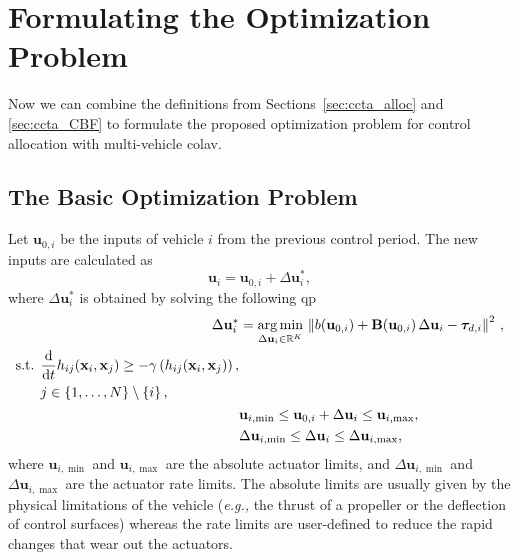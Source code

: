 \section{Formulating the Optimization Problem}
\label{sec:ccta_optimization}
Now we can combine the definitions from Sections~\ref{sec:ccta_alloc} and \ref{sec:ccta_CBF} to formulate the proposed optimization problem for control allocation with multi-vehicle \gls{colav}.

\subsection{The Basic Optimization Problem}
Let $\mathbf{u}_{0,i}$ be the inputs of vehicle $i$ from the previous control period.
The new inputs are calculated as
\begin{equation}
    \mathbf{u}_{i} = \mathbf{u}_{0,i} + \Delta\mathbf{u}_{i}^*,
\end{equation}
where $\Delta\mathbf{u}_{i}^*$ is obtained by solving the following \gls{qp}
\begin{subequations}
    \begin{align}
        \Delta\mathbf{u}_{i}^* &= \operatorname*{arg\,min}_{\Delta\mathbf{u}_{i}\in\mathbb{R}^{K}}\,\left\| b(\mathbf{u}_{0,i}) + \mathbf{B}(\mathbf{u}_{0,i})\,\Delta\mathbf{u}_{i} - \bm{\tau}_{d,i} \right\|^2\,, \label{eq:ccta_combined_avoidance_allocation_criterion} \\
        \begin{split}
            \text{s.t. }& \frac{{\rm d}}{{\rm d}t}h_{ij}(\mathbf{x}_{i}, \mathbf{x}_{j}) \geq - \gamma\left(h_{ij}(\mathbf{x}_{i}, \mathbf{x}_{j})\right), \\
            & j \in \left\{ 1, \ldots, N \right\} \setminus \left\{ i \right\},
        \end{split} \label{eq:ccta_combined_avoidance_allocation_constraint} \\
        & \mathbf{u}_{i,\min} \leq \mathbf{u}_{0,i} + \Delta\mathbf{u}_{i} \leq \mathbf{u}_{i,\max}, \\
        & \Delta\mathbf{u}_{i,\min} \leq \Delta\mathbf{u}_{i} \leq \Delta\mathbf{u}_{i,\max}, \label{eq:ccta_combined_avoidance_allocation_delta_u}
    \end{align}
    \label{eq:ccta_combined_avoidance_allocation}
\end{subequations}
\noindent where $\mathbf{u}_{i,\min}$ and $\mathbf{u}_{i,\max}$ are the absolute actuator limits, and $\Delta\mathbf{u}_{i,\min}$ and $\Delta\mathbf{u}_{i,\max}$ are the actuator rate limits.
The absolute limits are usually given by the physical limitations of the vehicle (\emph{e.g.,} the thrust of a propeller or the deflection of control surfaces) whereas the rate limits are user-defined to reduce the rapid changes that wear out the actuators.

